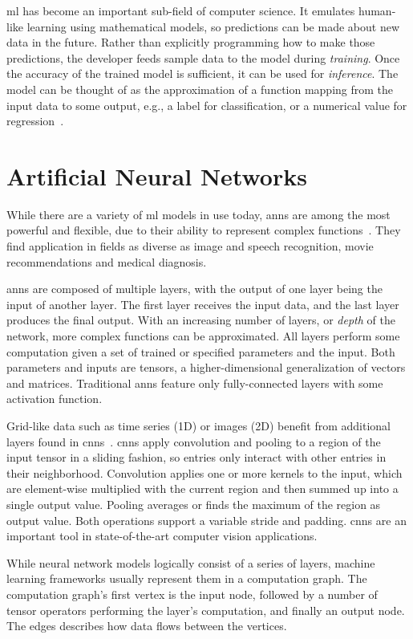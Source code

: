 \Gls{ml} has become an important sub-field of computer science. It emulates human-like learning using mathematical models, so predictions can be made about new data in the future. Rather than explicitly programming how to make those predictions, the developer feeds sample data to the model during \textit{training}. Once the accuracy of the trained model is sufficient, it can be used for \textit{inference}. The model can be thought of as the approximation of a function mapping from the input data to some output, e.g., a label for classification, or a numerical value for regression~\cite[p.~164]{IanGoodfellow.2016}.

\section{Artificial Neural Networks}
While there are a variety of \gls{ml} models in use today, \glspl{ann} are among the most powerful and flexible, due to their ability to represent complex functions~\cite[p.~163]{IanGoodfellow.2016}. They find application in fields as diverse as image and speech recognition, movie recommendations and medical diagnosis.

\Glspl{ann} are composed of multiple layers, with the output of one layer being the input of another layer. The first layer receives the input data, and the last layer produces the final output. With an increasing number of layers, or \textit{depth} of the network, more complex functions can be approximated. All layers perform some computation given a set of trained or specified parameters and the input. Both parameters and inputs are tensors, a higher-dimensional generalization of vectors and matrices. Traditional \glspl{ann} feature only fully-connected layers with some activation function.

Grid-like data such as time series (1D) or images (2D) benefit from additional layers found in \glspl{cnn}~\cite[p.~326]{IanGoodfellow.2016}. \Glspl{cnn} apply convolution and pooling to a region of the input tensor in a sliding fashion, so entries only interact with other entries in their neighborhood. Convolution applies one or more kernels to the input, which are element-wise multiplied with the current region and then summed up into a single output value. Pooling averages or finds the maximum of the region as output value. Both operations support a variable stride and padding. \Glspl{cnn} are an important tool in state-of-the-art computer vision applications.

While neural network models logically consist of a series of layers, machine learning frameworks usually represent them in a computation graph. The computation graph's first vertex is the input node, followed by a number of tensor operators performing the layer's computation, and finally an output node. The edges describes how data flows between the vertices.

